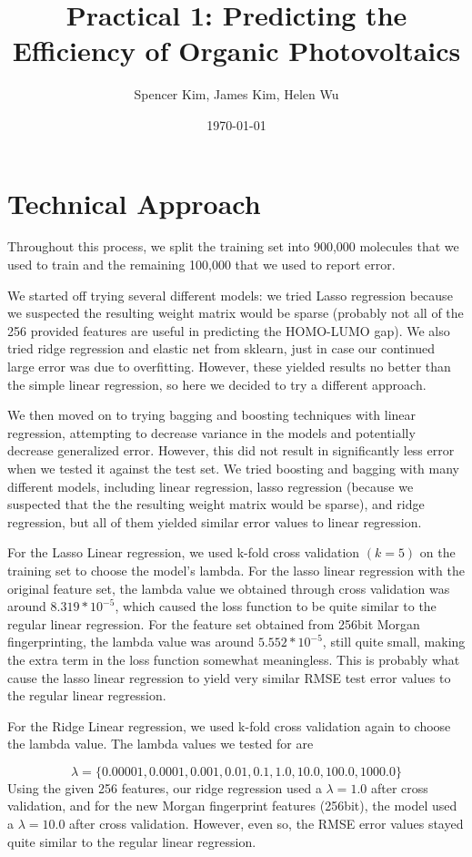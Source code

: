\documentclass[11pt]{article}
\title{Practical 1: Predicting the Efficiency of Organic Photovoltaics}
\author{Spencer Kim, James Kim, Helen Wu}
\date{\today}
\begin{document}
\maketitle
\section{Technical Approach}

Throughout this process, we split the training set into 900,000 molecules that we used to train and the remaining 100,000 that we used to report error.

We started off trying several different models: we tried Lasso regression because we suspected the resulting weight matrix would be sparse (probably not all of the 256 provided features are useful in predicting the HOMO-LUMO gap). We also tried ridge regression and elastic net from sklearn, just in case our continued large error was due to overfitting. However, these yielded results no better than the simple linear regression, so here we decided to try a different approach.

We then moved on to trying bagging and boosting techniques with linear regression, attempting to decrease variance in the models and potentially decrease generalized error. However, this did not result in significantly less error when we tested it against the test set. We tried boosting and bagging with many different models, including linear regression, lasso regression (because we suspected that the the resulting weight matrix would be sparse), and ridge regression, but all of them yielded similar error values to linear regression.

For the Lasso Linear regression, we used k-fold cross validation $(k = 5)$ on the training set to choose the model's lambda. For the lasso linear regression with the original feature set, the lambda value we obtained through cross validation was around $8.319 * 10^{-5}$, which caused the loss function to be quite similar to the regular linear regression. For the feature set obtained from 256bit Morgan fingerprinting, the lambda value was around $5.552 * 10^{-5}$, still quite small, making the extra term in the loss function somewhat meaningless. This is probably what cause the lasso linear regression to yield very similar RMSE test error values to the regular linear regression.

For the Ridge Linear regression, we used k-fold cross validation again to choose the lambda value. The lambda values we tested for are

\[
\lambda = \{ 0.00001, 0.0001, 0.001, 0.01, 0.1, 1.0, 10.0, 100.0, 1000.0 \}
\]
Using the given 256 features, our ridge regression used a $\lambda = 1.0$ after cross validation, and for the new Morgan fingerprint features (256bit), the model used a $\lambda = 10.0$ after cross validation. However, even so, the RMSE error values stayed quite similar to the regular linear regression.
\end{document}
